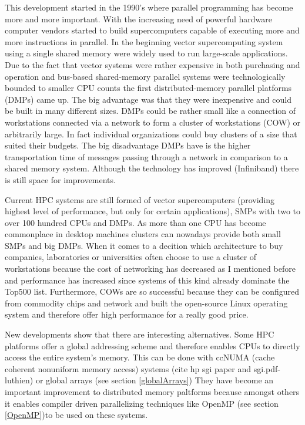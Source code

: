 This development started in the 1990's where parallel programming has
become more and more important. With the increasing need of powerful
hardware computer vendors started to build supercomputers capable of
executing more and more instructions in parallel. In the beginning
vector supercomputing system using a single shared memory were widely
used to run large-scale applications. Due to the fact that vector
systems were rather expensive in both purchasing and operation and
bus-based shared-memory parallel systems were technologically bounded
to smaller CPU counts the first distributed-memory parallel platforms (DMPs)
came up. The big advantage was that they were inexpensive and could be
built in many different sizes. DMPs could be rather small like a
connection of workstations connected via a network to form a cluster of
workstations (COW) or arbitrarily large. In fact individual
organizations could buy clusters of a size that suited their
budgets. The big disadvantage DMPs have is the higher transportation
time of messages passing through a network in comparison to a shared
memory system. Although the technology has improved (Infiniband) there
is still space for improvements. 

Current HPC systems are still formed of vector supercomputers
(providing highest level of performance, but only for certain
applications), SMPs with two to over 100 hundred CPUs and DMPs. As
more than one CPU has become commonplace in desktop machines clusters
can nowadays provide both small SMPs and big DMPs. When it comes to a
decition which architecture to buy companies, laboratories or
universities often choose to use a cluster of workstations because the
cost of networking has decreased as I mentioned before and performance
has increased since systems of this kind already dominate the Top500
list. Furthermore, COWs are so successful because they can be
configured from commodity chips and network and built the open-source
Linux operating system and therefore offer high performance for a
really good price.

New developments show that there are interesting alternatives. Some
HPC platforms offer a global addressing scheme and therefore enables
CPUs to directly access the entire system's memory. This can be done
with ccNUMA (cache coherent nonuniform memory access) systems (cite hp
sgi paper and sgi.pdf-luthien) or
global arrays (see section \ref{globalArrays})
They have become an important improvement to distributed memory
paltforms because amongst others it enables compiler driven
parallelizing techniques like OpenMP (see section \ref{OpenMP})to be
used on these systems. 
 
